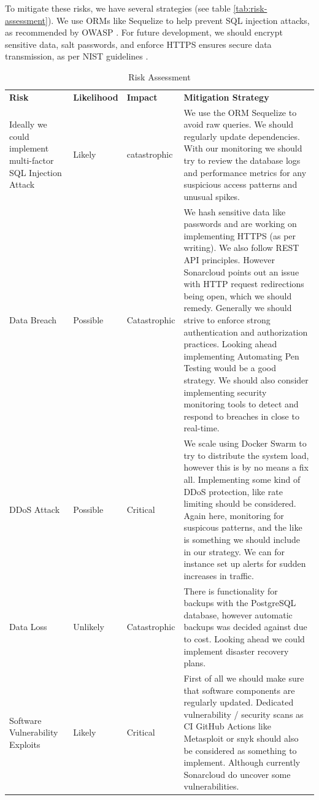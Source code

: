 \documentclass[11pt]{article}
\begin{document}
To mitigate these risks, we have several strategies (see table \ref{tab:risk-assessment}). We use ORMs like Sequelize to help prevent SQL injection attacks, as recommended by OWASP \citep{owasp_sql_prevention}. For future development, we should encrypt sensitive data, salt passwords, and enforce HTTPS ensures secure data transmission, as per NIST guidelines \citep{nist_tls}. 


\begin{table}[H]
    \centering
    \caption{Risk Assessment}
    \begin{tabular}{|p{3cm}|p{2cm}|p{2cm}|p{7cm}|}
        \hline
        \textbf{Risk} & \textbf{Likelihood} & \textbf{Impact} & \textbf{Mitigation Strategy} \\Ideally we could implement multi-factor
        SQL Injection Attack & Likely & catastrophic & We use the ORM Sequelize to avoid raw queries. We should regularly update dependencies. With our monitoring we should try to review the database logs and performance metrics for any suspicious access patterns and unusual spikes. \\
        \hline
        Data Breach & Possible & Catastrophic & We hash sensitive data like passwords and are working on implementing HTTPS (as per writing). We also follow REST API principles. However Sonarcloud points out an issue with HTTP request redirections being open, which we should remedy. Generally we should strive to enforce strong authentication and authorization practices. Looking ahead implementing Automating Pen Testing
        would be a good strategy. We should also consider implementing security monitoring tools to detect and respond to breaches in close to real-time. \\
        \hline
        DDoS Attack & Possible & Critical &  We scale using Docker Swarm to try to distribute the system load, however this is by no  means a fix all. Implementing some kind of  DDoS protection, like rate limiting should be considered. Again here, monitoring for suspicous patterns, and the like is something we should include in our strategy. We can for instance set up alerts for sudden increases in traffic. \\
        \hline
        Data Loss & Unlikely & Catastrophic & There is functionality for backups with the PostgreSQL database, however automatic backups was decided against due to cost. Looking ahead we could  implement disaster recovery plans. \\
        \hline
        Software Vulnerability Exploits & Likely & Critical & First of all we should make sure that software components are regularly updated. Dedicated vulnerability / security scans as CI GitHub Actions like Metasploit or snyk  should also be considered as something to implement. Although currently Sonarcloud do uncover some vulnerabilities.  \\

\end{tabular}
\end{table}
\end{document}
